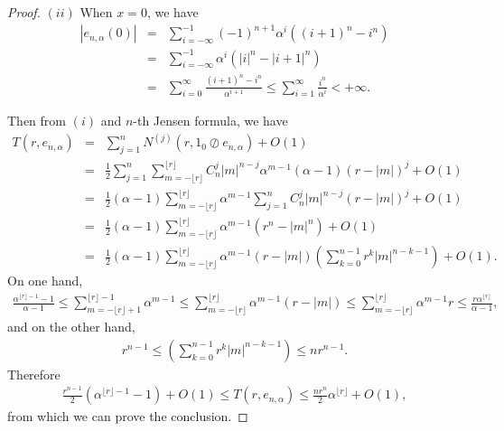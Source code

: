 \documentclass{article}
\begin{document}
\begin{proof}
    $(ii)$ When $x=0$, we have
    \begin{eqnarray*}
        |e_{n, \alpha}(0)|&=&\sum_{i=-\infty}^{-1}(-1)^{n+1}\alpha^{i}((i+1)^{n}-i^{n})\\
        &=&\sum_{i=-\infty}^{-1}\alpha^{i}(|i|^{n}-|i+1|^{n})\\
        &=&\sum_{i=0}^{\infty}\frac{(i+1)^{n}-i^{n}}{\alpha^{i+1}}\leq \sum_{i=1}^{\infty}\frac{i^{n}}{\alpha^{i}}< +\infty.
    \end{eqnarray*}
    
    Then from $(i)$ and $n$-th Jensen formula, we have
    \begin{eqnarray*}\label{3a4}
        T(r, e_{n, \alpha})&=& \sum_{j=1}^{n}N^{(j)}(r, 1_{0}\oslash e_{n, \alpha})\nonumber+O(1)\\
        &=&\frac{1}{2}\sum_{j=1}^{n}\sum_{m=-\lfloor r\rfloor}^{\lfloor r\rfloor}C_{n}^{j}|m|^{n-j}\alpha^{m-1}(\alpha-1)(r-|m|)^{j}+O(1)\nonumber\\
        &=&\frac{1}{2}(\alpha-1)\sum_{m=-\lfloor r\rfloor}^{\lfloor r\rfloor}\alpha^{m-1}\sum_{j=1}^{n}C_{n}^{j}|m|^{n-j}(r-|m|)^{j}+O(1)\nonumber\\
        &=&\frac{1}{2}(\alpha-1)\sum_{m=-\lfloor r\rfloor}^{\lfloor r\rfloor}\alpha^{m-1}(r^{n}-|m|^{n})+O(1)\nonumber\\
        &=&\frac{1}{2}(\alpha-1)\sum_{m=-\lfloor r\rfloor}^{\lfloor r\rfloor}\alpha^{m-1}(r-|m|)\left(\sum_{k=0}^{n-1}r^{k}|m|^{n-k-1}\right)+O(1).
    \end{eqnarray*}
    On one hand,
    \begin{eqnarray*}
        \frac{\alpha^{\lfloor r\rfloor-1}-1}{\alpha-1}\leq\sum_{m=-\lfloor r\rfloor+1}^{\lfloor r\rfloor-1}\alpha^{m-1}\leq \sum_{m=-\lfloor r\rfloor}^{\lfloor r\rfloor}\alpha^{m-1}(r-|m|)\leq \sum_{m=-\lfloor r\rfloor}^{\lfloor r\rfloor}\alpha^{m-1}r\leq \frac{r\alpha^{\lfloor r\rfloor}}{\alpha-1},
    \end{eqnarray*}
    and on the other hand,
    \begin{eqnarray*}
        r^{n-1}\leq \left(\sum_{k=0}^{n-1}r^{k}|m|^{n-k-1}\right)\leq n r^{n-1}.
    \end{eqnarray*}
    Therefore
    \begin{eqnarray*}\label{3a3}
        \frac{r^{n-1}}{2}(\alpha^{\lfloor r\rfloor-1}-1)+O(1)\leq T(r, e_{n, \alpha})\leq \frac{n r^{n}}{2}\alpha^{\lfloor r\rfloor}+O(1),
    \end{eqnarray*}
    from which we can prove the conclusion.
\end{proof}
\end{document}

